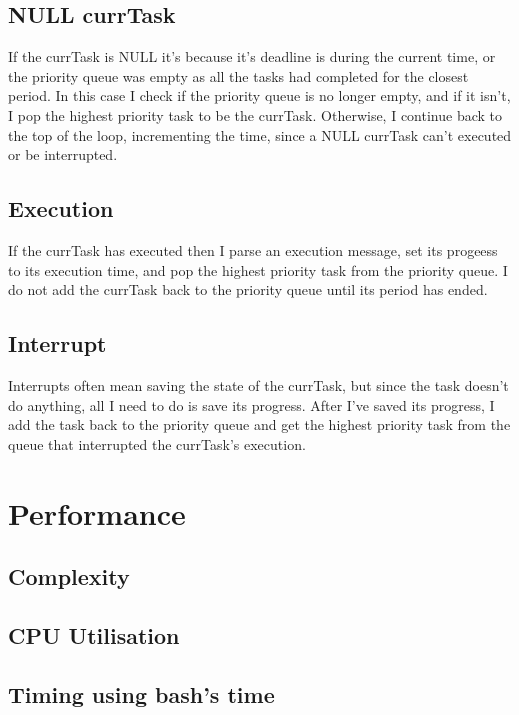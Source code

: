 \documentclass{article}
\begin{document}
    \subsection{NULL currTask}
    If the currTask is NULL it's because it's deadline is during the current time, or the priority queue was empty as all the tasks had completed for the closest period. \newline
    In this case I check if the priority queue is no longer empty, and if it isn't, I pop the highest priority task to be the currTask. \newline
    Otherwise, I continue back to the top of the loop, incrementing the time, since a NULL currTask can't executed or be interrupted. 
    \subsection{Execution}
    If the currTask has executed then I parse an execution message, set its progeess to its execution time, and pop the highest priority task from the priority queue. \newline
    I do not add the currTask back to the priority queue until its period has ended. 
    \subsection{Interrupt}
    Interrupts often mean saving the state of the currTask, but since the task doesn't do anything, all I need to do is save its progress. \newline
    After I've saved its progress, I add the task back to the priority queue and get the highest priority task from the queue that interrupted the currTask's execution.
    \section{Performance}
    \subsection{Complexity}
    \subsection{CPU Utilisation}
    \subsection{Timing using bash's time}
    \appendix{}
\end{document}
